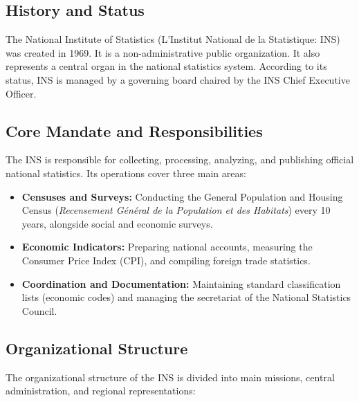 \documentclass[12pt,a4paper]{report}
\begin{document}
\subsection{History and Status}
The National Institute of Statistics (L'Institut National de la Statistique: INS) was created in 1969. It is a non-administrative public organization. It also represents a central organ in the national statistics system. According to its status, INS is managed by a governing board chaired by the INS Chief Executive Officer.

\subsection{Core Mandate and Responsibilities}
The INS is responsible for collecting, processing, analyzing, and publishing official national statistics. Its operations cover three main areas:
\begin{itemize}
    \item \textbf{Censuses and Surveys:} Conducting the General Population and Housing Census (\textit{Recensement Général de la Population et des Habitats}) every 10 years, alongside social and economic surveys.
    \item \textbf{Economic Indicators:} Preparing national accounts, measuring the Consumer Price Index (CPI), and compiling foreign trade statistics.
    \item \textbf{Coordination and Documentation:} Maintaining standard classification lists (economic codes) and managing the secretariat of the National Statistics Council.
\end{itemize}

\subsection{Organizational Structure}
The organizational structure of the INS is divided into main missions, central administration, and regional representations:
\end{document}
